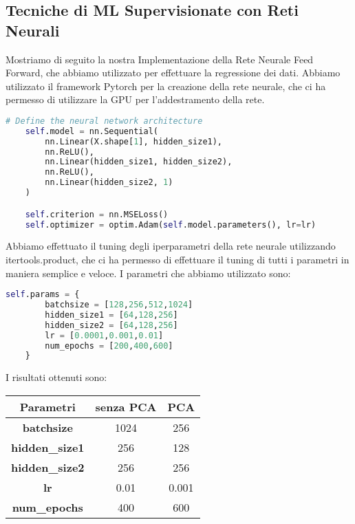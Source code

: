 \documentclass[../../Report.tex]{subfiles}
\begin{document}
\subsection{Tecniche di ML Supervisionate con Reti Neurali}
Mostriamo di seguito la nostra Implementazione della Rete Neurale Feed Forward, che abbiamo utilizzato per effettuare la regressione dei dati.
Abbiamo utilizzato il framework Pytorch per la creazione della rete neurale, che ci ha permesso di utilizzare la GPU per l'addestramento della rete.

\begin{lstlisting}[language=python]
    # Define the neural network architecture
    self.model = nn.Sequential(
        nn.Linear(X.shape[1], hidden_size1),
        nn.ReLU(),
        nn.Linear(hidden_size1, hidden_size2),
        nn.ReLU(),
        nn.Linear(hidden_size2, 1)
    )

    self.criterion = nn.MSELoss()
    self.optimizer = optim.Adam(self.model.parameters(), lr=lr)

\end{lstlisting}

Abbiamo effettuato il tuning degli iperparametri della rete neurale utilizzando itertools.product, che ci ha permesso di effettuare il tuning di tutti i parametri in maniera semplice e veloce.
I parametri che abbiamo utilizzato sono:
\begin{lstlisting}[language=python]
    self.params = {
        batchsize = [128,256,512,1024]	
        hidden_size1 = [64,128,256]
        hidden_size2 = [64,128,256]
        lr = [0.0001,0.001,0.01]
        num_epochs = [200,400,600]
    }
\end{lstlisting}
I risultati ottenuti sono:
\begin{table}[h]
    \centering
    \begin{tabular}{|c|c|c|}
    \hline
\textbf{Parametri} & \textbf{senza PCA} & \textbf{PCA} \\ \hline
\textbf{batchsize}& 1024 & 256\\
\textbf{hidden\_size1}& 256 &  128 \\
\textbf{hidden\_size2}& 256 & 256\\
\textbf{lr}& 0.01 &  0.001\\
\textbf{num\_epochs}& 400 & 600\\
\hline
\end{tabular}
\end{table}
\end{document}
